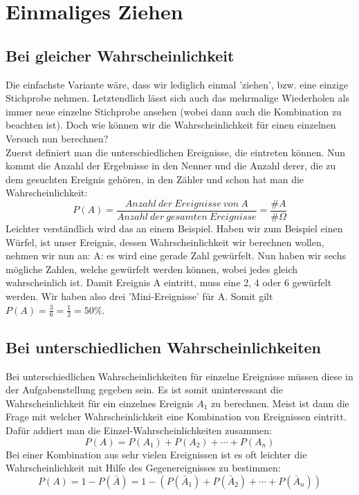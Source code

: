 \section{Einmaliges Ziehen}
	\subsection{Bei gleicher Wahrscheinlichkeit}
		Die einfachste Variante wäre, dass wir lediglich einmal 'ziehen', bzw. eine
		einzige Stichprobe nehmen. Letztendlich lässt sich auch das mehrmalige
		Wiederholen als immer neue einzelne Stichprobe ansehen (wobei dann auch die
		Kombination zu beachten ist). Doch wie können wir die Wahrscheinlichkeit für
		einen einzelnen Versuch nun berechnen?\\
		Zuerst definiert man die unterschiedlichen Ereignisse, die eintreten können.
		Nun kommt die Anzahl der Ergebnisse in den Nenner und die Anzahl derer, die zu
		dem gesuchten Ereignis gehören, in den Zähler und schon hat man die
		Wahrscheinlichkeit:
		\[P(A)=\frac{Anzahl\ der\ Ereignisse\ von\ A}{Anzahl\ der\ gesamten\
		Ereignisse}=\frac{\#A}{\#\Omega}\] Leichter verständlich wird das an einem
		Beispiel. Haben wir zum Beispiel einen Würfel, ist unser Ereignis, dessen
		Wahrscheinlichkeit wir berechnen wollen, nehmen wir nun an: A: es wird eine
		gerade Zahl gewürfelt. Nun haben wir sechs mögliche Zahlen, welche gewürfelt
		werden können, wobei jedes gleich wahrscheinlich ist. Damit Ereignis A
		eintritt, muss eine 2, 4 oder 6 gewürfelt werden. Wir haben also drei
		'Mini-Ereignisse' für A. Somit gilt \(P(A)=\frac{3}{6}=\frac{1}{2}=50\%\).
	
	\subsection{Bei unterschiedlichen Wahrscheinlichkeiten}
		Bei unterschiedlichen Wahrscheinlichkeiten für einzelne Ereignisse müssen
		diese in der Aufgabenstellung gegeben sein. Es ist somit uninteressant die
		Wahrscheinlichkeit für ein einzelnes Ereignis $A_1$ zu berechnen. Meist ist
		dann die Frage mit welcher Wahrscheinlichkeit eine Kombination von Ereignissen
		eintritt. Dafür addiert man die Einzel-Wahrscheinlichkeiten zusammen:
		\[P(A)=P(A_1)+P(A_2)+\cdots+P(A_n)\]
		Bei einer Kombination aus sehr vielen Ereignissen ist es oft leichter die
		Wahrscheinlichkeit mit Hilfe des Gegenereignisses zu bestimmen:
		\[P(A)=1-P(\bar{A})=1-(P(\bar{A}_1)+P(\bar{A}_2)+\cdots+P(\bar{A}_n))\]
